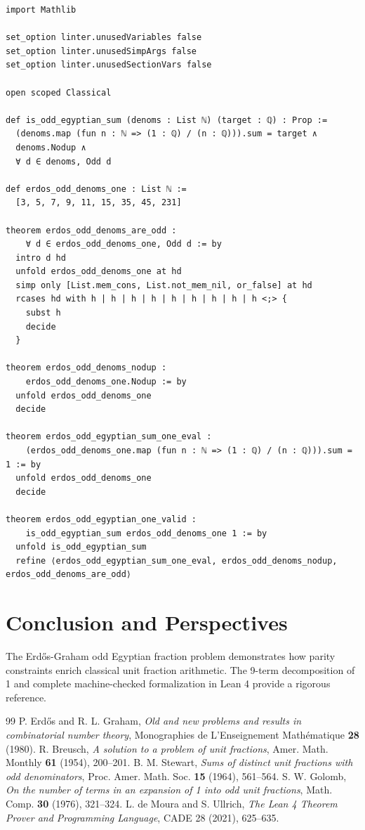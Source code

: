 \documentclass[11pt,a4paper]{article}
\theoremstyle{definition}
\begin{document}
\begin{lstlisting}[caption={Formal Lean 4 Implementation of Odd Egyptian Fractions}]
import Mathlib

set_option linter.unusedVariables false
set_option linter.unusedSimpArgs false
set_option linter.unusedSectionVars false

open scoped Classical

def is_odd_egyptian_sum (denoms : List ℕ) (target : ℚ) : Prop :=
  (denoms.map (fun n : ℕ => (1 : ℚ) / (n : ℚ))).sum = target ∧
  denoms.Nodup ∧
  ∀ d ∈ denoms, Odd d

def erdos_odd_denoms_one : List ℕ :=
  [3, 5, 7, 9, 11, 15, 35, 45, 231]

theorem erdos_odd_denoms_are_odd :
    ∀ d ∈ erdos_odd_denoms_one, Odd d := by
  intro d hd
  unfold erdos_odd_denoms_one at hd
  simp only [List.mem_cons, List.not_mem_nil, or_false] at hd
  rcases hd with h | h | h | h | h | h | h | h | h <;> {
    subst h
    decide
  }

theorem erdos_odd_denoms_nodup :
    erdos_odd_denoms_one.Nodup := by
  unfold erdos_odd_denoms_one
  decide

theorem erdos_odd_egyptian_sum_one_eval :
    (erdos_odd_denoms_one.map (fun n : ℕ => (1 : ℚ) / (n : ℚ))).sum = 1 := by
  unfold erdos_odd_denoms_one
  decide

theorem erdos_odd_egyptian_one_valid :
    is_odd_egyptian_sum erdos_odd_denoms_one 1 := by
  unfold is_odd_egyptian_sum
  refine ⟨erdos_odd_egyptian_sum_one_eval, erdos_odd_denoms_nodup, erdos_odd_denoms_are_odd⟩
\end{lstlisting}

\section{Conclusion and Perspectives}
The Erd\H{o}s-Graham odd Egyptian fraction problem demonstrates how parity constraints enrich classical unit fraction arithmetic. The 9-term decomposition of 1 and complete machine-checked formalization in Lean 4 provide a rigorous reference.

\begin{thebibliography}{99}
 P. Erd\H{o}s and R. L. Graham, \textit{Old and new problems and results in combinatorial number theory}, Monographies de L'Enseignement Math\'ematique \textbf{28} (1980).
 R. Breusch, \textit{A solution to a problem of unit fractions}, Amer. Math. Monthly \textbf{61} (1954), 200--201.
 B. M. Stewart, \textit{Sums of distinct unit fractions with odd denominators}, Proc. Amer. Math. Soc. \textbf{15} (1964), 561--564.
 S. W. Golomb, \textit{On the number of terms in an expansion of 1 into odd unit fractions}, Math. Comp. \textbf{30} (1976), 321--324.
 L. de Moura and S. Ullrich, \textit{The Lean 4 Theorem Prover and Programming Language}, CADE 28 (2021), 625--635.
\end{thebibliography}
\end{document}
